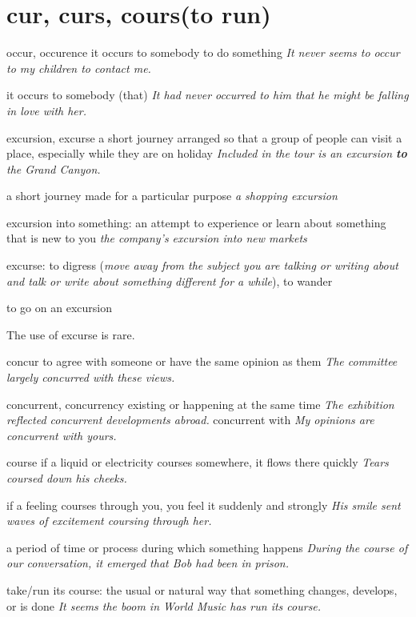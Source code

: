 \chapter{cur, curs, cours(to run)}

\begin{word}{occur, occurence}
    it occurs to somebody to do something 
    \textit{It never seems to occur to my children to contact me.}
    
    it occurs to somebody (that)
    \textit{It had never occurred to him that he might be falling in love with her.}
\end{word}

\begin{word}{excursion, excurse}
    a short journey arranged so that a group of people can visit a place, especially while they are on holiday
    \textit{Included in the tour is an excursion \textbf{to} the Grand Canyon.}

    a short journey made for a particular purpose
    \textit{a shopping excursion}

    excursion into something: an attempt to experience or learn about something that is new to you
    \textit{the company's excursion into new markets}

    excurse: to digress (\textit{move away from the subject you are talking or writing about and talk or write about something different for a while}), to wander

    to go on an excursion
\end{word}

\begin{remark}
    The use of excurse is rare.
\end{remark}

\begin{word}{concur}
    to agree with someone or have the same opinion as them
    \textit{The committee largely concurred with these views.}
\end{word}

\begin{word}{concurrent, concurrency}
    existing or happening at the same time
    \textit{The exhibition reflected concurrent developments abroad.}
    concurrent with
    \textit{My opinions are concurrent with yours.}
\end{word}

\begin{word}{course}
    if a liquid or electricity courses somewhere, it flows there quickly
    \textit{Tears coursed down his cheeks.}

    if a feeling courses through you, you feel it suddenly and strongly
    \textit{His smile sent waves of excitement coursing through her.}

    a period of time or process during which something happens
    \textit{During the course of our conversation, it emerged that Bob had been in prison.}

    take/run its course: the usual or natural way that something changes, develops, or is done
    \textit{It seems the boom in World Music has run its course.}
\end{word}
